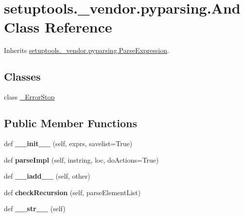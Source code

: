 \hypertarget{classsetuptools_1_1__vendor_1_1pyparsing_1_1_and}{}\section{setuptools.\+\_\+vendor.\+pyparsing.\+And Class Reference}
\label{classsetuptools_1_1__vendor_1_1pyparsing_1_1_and}


Inherits \hyperlink{classsetuptools_1_1__vendor_1_1pyparsing_1_1_parse_expression}{setuptools.\+\_\+vendor.\+pyparsing.\+Parse\+Expression}.

\subsection*{Classes}
\begin{DoxyCompactItemize}
\item 
class \hyperlink{classsetuptools_1_1__vendor_1_1pyparsing_1_1_and_1_1___error_stop}{\+\_\+\+Error\+Stop}
\end{DoxyCompactItemize}
\subsection*{Public Member Functions}
\begin{DoxyCompactItemize}
\item 
\mbox{\label{classsetuptools_1_1__vendor_1_1pyparsing_1_1_and_a59d77c899356bf54d089ad7a17a5ecd3}} 
def {\bfseries \+\_\+\+\_\+init\+\_\+\+\_\+} (self, exprs, savelist=True)
\item 
\mbox{\label{classsetuptools_1_1__vendor_1_1pyparsing_1_1_and_a0ce053c8ce13c73b1efc28c11902037d}} 
def {\bfseries parse\+Impl} (self, instring, loc, do\+Actions=True)
\item 
\mbox{\label{classsetuptools_1_1__vendor_1_1pyparsing_1_1_and_abd80bd1cba05b111f1c56661ced6f228}} 
def {\bfseries \+\_\+\+\_\+iadd\+\_\+\+\_\+} (self, other)
\item 
\mbox{\label{classsetuptools_1_1__vendor_1_1pyparsing_1_1_and_ab30ab396462a7d5f0ee26d0a9f429c3f}} 
def {\bfseries check\+Recursion} (self, parse\+Element\+List)
\item 
\mbox{\label{classsetuptools_1_1__vendor_1_1pyparsing_1_1_and_aa4ba9495e7806de3a2de95cdfa6d5ba4}} 
def {\bfseries \+\_\+\+\_\+str\+\_\+\+\_\+} (self)
\end{DoxyCompactItemize}
